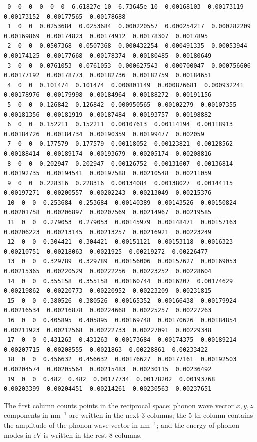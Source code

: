 \documentclass[12pt]{article}
\begin{document}
{\begin{verbatim}
 0  0  0  0  0  0  6.61827e-10  6.73645e-10  0.00168103  0.00173119  0.00173152  0.00177565  0.00178688 
 1  0  0  0.0253684  0.0253684  0.000220557  0.000254217  0.000282209  0.00169869  0.00174823  0.00174912  0.00178307  0.0017895 
 2  0  0  0.0507368  0.0507368  0.000432254  0.000491335  0.00053944  0.00174125  0.00177668  0.00178374  0.00180485  0.00180649 
 3  0  0  0.0761053  0.0761053  0.000627543  0.000700047  0.000756606  0.00177192  0.00178773  0.00182736  0.00182759  0.00184651 
 4  0  0  0.101474  0.101474  0.000801149  0.000876681  0.000932241  0.00178976  0.00179998  0.00184964  0.00188272  0.00191156  
 5  0  0  0.126842  0.126842  0.000950565  0.00102279  0.00107355  0.00181356  0.00181919  0.00187484  0.00193757  0.00198882  
 6  0  0  0.152211  0.152211  0.00107613  0.00114194  0.00118913  0.00184726  0.00184734  0.00190359  0.00199477  0.002059  
 7  0  0  0.177579  0.177579  0.00118052  0.00123821  0.00128562  0.00188414  0.00189174  0.00193679  0.00205174  0.00208816  
 8  0  0  0.202947  0.202947  0.00126752  0.00131607  0.00136814  0.00192735  0.00194541  0.00197588  0.00210548  0.00211059  
 9  0  0  0.228316  0.228316  0.00134084  0.00138027  0.00144115  0.00197271  0.00200557  0.00202243  0.00213049  0.00215376  
 10  0  0  0.253684  0.253684  0.00140389  0.00143526  0.00150824  0.00201758  0.00206897  0.00207569  0.00214967  0.00219585  
 11  0  0  0.279053  0.279053  0.00145979  0.00148471  0.00157163  0.00206223  0.00213145  0.00213257  0.00216921  0.00223249  
 12  0  0  0.304421  0.304421  0.00151121  0.00153118  0.0016323  0.00210751  0.00218063  0.0021925  0.00219272  0.00226477  
 13  0  0  0.329789  0.329789  0.00156006  0.00157627  0.00169053  0.00215365  0.00220529  0.00222256  0.00223252  0.00228604  
 14  0  0  0.355158  0.355158  0.00160744  0.0016207  0.00174629  0.00219862  0.00220773  0.00220952  0.00223209  0.00231815  
 15  0  0  0.380526  0.380526  0.00165352  0.00166438  0.00179924  0.00216534  0.00216878  0.00224668  0.00225257  0.00227263  
 16  0  0  0.405895  0.405895  0.00169748  0.00170626  0.00184854  0.00211923  0.00212568  0.00222733  0.00227091  0.00229348  
 17  0  0  0.431263  0.431263  0.00173684  0.00174375  0.00189214  0.00207715  0.00208555  0.0021863  0.00228861  0.00233422  
 18  0  0  0.456632  0.456632  0.00176627  0.00177161  0.00192503  0.00204574  0.00205564  0.00215483  0.00230115  0.00236492  
 19  0  0  0.482  0.482  0.00177734  0.00178202  0.00193768  0.00203399  0.00204451  0.00214261  0.00230563  0.00237651  
\end{verbatim}
} The first column counts points in the reciprocal space; phonon wave
vector $x,y,z$ components in nm$^{-1}$ are written in the next 3
columns; the 5-th column contains the amplitude of the phonon wave
vector in nm$^{-1}$; and the energy of phonon modes in eV is written in the
rest 8 columns.
\end{document}
